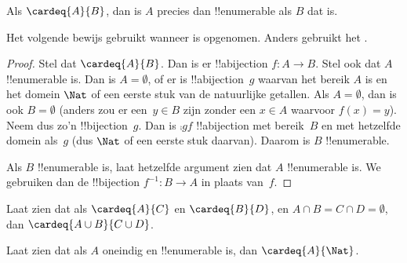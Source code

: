 \documentclass[../../../include/open-logic-section]{subfiles}
\begin{document}
\begin{prop}
Als $\cardeq{A}{B}$, dan is $A$ precies dan !!{enumerable} als $B$ dat is.
\end{prop}

\begin{editorial}
Het volgende bewijs gebruikt  wanneer
 is opgenomen. Anders gebruikt het
.
\end{editorial}

\begin{proof}
Stel dat $\cardeq{A}{B}$. Dan is er !!a{bijection} $f \colon A
\to B$. Stel ook dat $A$ !!{enumerable} is.
{
  Dan is $A = \emptyset$, of er is !!a{bijection}~$g$ waarvan het bereik
  $A$ is en het domein $\Nat$ of een eerste stuk van de natuurlijke getallen. Als
  $A = \emptyset$, dan is ook $B = \emptyset$ (anders zou er een~$y \in B$
  zijn zonder een $x \in A$ waarvoor $f(x) = y$). Neem dus zo'n
  !!{bijection}~$g$. Dan is $\comp{g}{f}$ !!a{bijection} met bereik~$B$ en
  met hetzelfde domein als~$g$ (dus $\Nat$ of een eerste stuk daarvan).
  Daarom is $B$ !!{enumerable}.}

Als $B$ !!{enumerable} is, laat hetzelfde argument zien dat $A$
!!{enumerable} is. We gebruiken dan de !!{bijection} $f^{-1}\colon B \to A$
in plaats van~$f$.
\end{proof}

\begin{prob}
Laat zien dat als $\cardeq{A}{C}$ en $\cardeq{B}{D}$, en $A \cap B =
C \cap D = \emptyset$, dan $\cardeq{A \cup B}{C \cup D}$.
\end{prob}

\begin{prob}
Laat zien dat als $A$ oneindig en !!{enumerable} is, dan
$\cardeq{A}{\Nat}$.
\end{prob}
\end{document}
